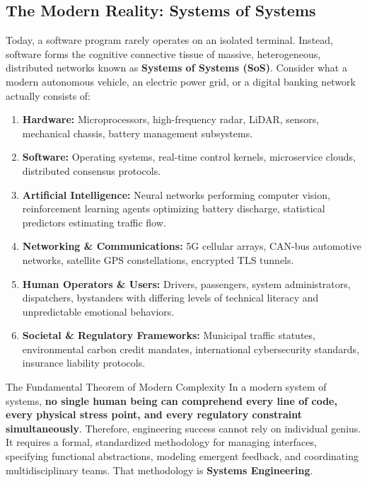 \subsection{The Modern Reality: Systems of Systems}
Today, a software program rarely operates on an isolated terminal. Instead, software forms the cognitive connective tissue of massive, heterogeneous, distributed networks known as \textbf{Systems of Systems (SoS)}. Consider what a modern autonomous vehicle, an electric power grid, or a digital banking network actually consists of:
\begin{enumerate}[leftmargin=2em]
    \item \textbf{Hardware:} Microprocessors, high-frequency radar, LiDAR, sensors, mechanical chassis, battery management subsystems.
    \item \textbf{Software:} Operating systems, real-time control kernels, microservice clouds, distributed consensus protocols.
    \item \textbf{Artificial Intelligence:} Neural networks performing computer vision, reinforcement learning agents optimizing battery discharge, statistical predictors estimating traffic flow.
    \item \textbf{Networking \& Communications:} 5G cellular arrays, CAN-bus automotive networks, satellite GPS constellations, encrypted TLS tunnels.
    \item \textbf{Human Operators \& Users:} Drivers, passengers, system administrators, dispatchers, bystanders with differing levels of technical literacy and unpredictable emotional behaviors.
    \item \textbf{Societal \& Regulatory Frameworks:} Municipal traffic statutes, environmental carbon credit mandates, international cybersecurity standards, insurance liability protocols.
\end{enumerate}

\begin{takeawaybox}{The Fundamental Theorem of Modern Complexity}
In a modern system of systems, \textbf{no single human being can comprehend every line of code, every physical stress point, and every regulatory constraint simultaneously}. 
Therefore, engineering success cannot rely on individual genius. It requires a formal, standardized methodology for managing interfaces, specifying functional abstractions, modeling emergent feedback, and coordinating multidisciplinary teams. That methodology is \textbf{Systems Engineering}.
\end{takeawaybox}

